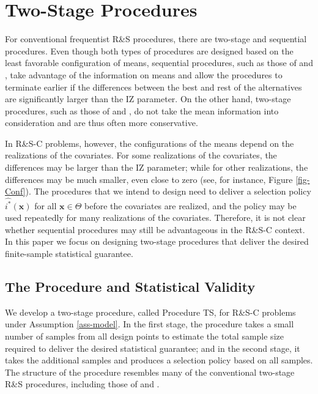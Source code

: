 \documentclass[ijoc,nonblindrev]{informs3}
\def\bx{{\bm x}}
\begin{document}
\section{Two-Stage Procedures} \label{sec-hom}

For conventional frequentist R\&S procedures, there are two-stage and sequential procedures.
Even though both types of procedures are designed based on the least favorable configuration of means, sequential procedures, such as those of \cite{kim2001} and \cite{hong2006},
take advantage of the information on means and allow the procedures to terminate earlier if the differences between the best and rest of the alternatives are significantly larger than the IZ parameter.
On the other hand, two-stage procedures, such as those of \cite{dudewicz1975} and \cite{rinott1978}, do not take the mean information into consideration and are thus often more conservative.

In R\&S-C problems, however, the configurations of the means depend on the realizations of the covariates.
For some realizations of the covariates, the differences may be larger than the IZ parameter;
while for other realizations, the differences may be much smaller, even close to zero (see, for instance, Figure \ref{fig-Conf}).
The procedures that we intend to design need to deliver a selection policy $\widehat {i^*}(\bx)$ for all $\bx\in\Theta$ before the covariates are realized,
and the policy may be used repeatedly for many realizations of the covariates.
Therefore, it is not clear whether sequential procedures may still be advantageous in the R\&S-C context.
In this paper we focus on designing two-stage procedures that deliver the desired finite-sample statistical guarantee.

\subsection{The Procedure and Statistical Validity}

We develop a two-stage procedure, called Procedure TS, for R\&S-C problems under Assumption \ref{ass-model}.
In the first stage, the procedure takes a small number of samples from all design points to estimate the total sample size required to deliver the desired statistical guarantee;
and in the second stage, it takes the additional samples and produces a selection policy based on all samples.
The structure of the procedure resembles many of the conventional two-stage R\&S procedures, including those of \cite{dudewicz1975} and \cite{rinott1978}.
\end{document}

